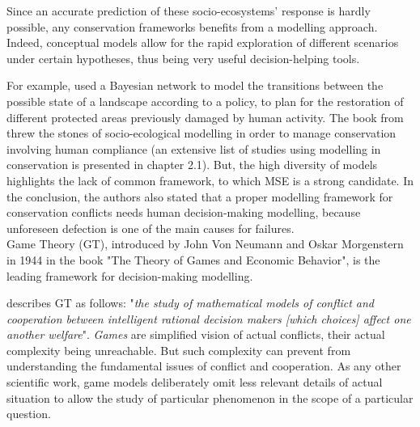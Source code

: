 \documentclass[12pt,a4paper]{article}
\begin{document}
Since an accurate prediction of these socio-ecosystems' response is hardly possible, any conservation frameworks benefits from a modelling approach.
Indeed, conceptual models allow for the rapid exploration of different scenarios under certain hypotheses, thus being very useful decision-helping tools.
%

For example, \cite{rumpff2011state} used a Bayesian network to model the transitions between the possible state of a landscape according to a policy, to plan for the restoration of different protected areas previously damaged by human activity.
The book from \cite{schluter2012new} threw the stones of socio-ecological modelling in order to manage conservation involving human compliance (an extensive list of studies using modelling in conservation is presented in chapter 2.1).
But, the high diversity of models highlights the lack of common framework, to which MSE is a strong candidate.
In the conclusion, the authors also stated that a proper modelling framework for conservation conflicts needs human decision-making modelling, because unforeseen defection is one of the main causes for failures.\\
%

Game Theory (GT), introduced by John Von Neumann and Oskar Morgenstern in 1944 in the book "The Theory of Games and Economic Behavior", is the leading framework for decision-making modelling.

\cite{myerson1997game} describes GT as follows: "\textit{the study of mathematical models of conflict and cooperation between intelligent rational decision makers [which choices] affect one another welfare}".
\textit{Games} are simplified vision of actual conflicts, their actual complexity being unreachable.
But such complexity can prevent from understanding the fundamental issues of conflict and cooperation.
As any other scientific work, game models deliberately omit less relevant details of actual situation to allow the study of particular phenomenon in the scope of a particular question.
\end{document}

